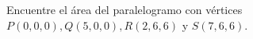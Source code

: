 \item Encuentre el área del paralelogramo con vértices $P(0, 0, 0), Q(5, 0, 0), R(2, 6, 6)$ y $S(7, 6, 6)$.
